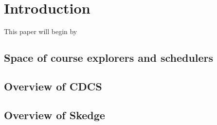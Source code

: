 
\chapter{Introduction}

This paper will begin by 

\section{Space of course explorers and schedulers}

\section{Overview of CDCS}

\section{Overview of Skedge}


